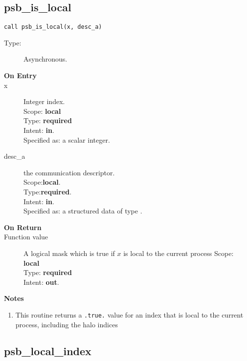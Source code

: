 \clearpage\subsection*{psb\_is\_local }

\begin{verbatim}
call psb_is_local(x, desc_a)
\end{verbatim}

\begin{description}
\item[Type:] Asynchronous.
\item[\bf On Entry]
\item[x] Integer index.\\
Scope: {\bf local} \\
Type: {\bf required}\\
Intent: {\bf in}.\\
Specified as: a scalar integer.\\
\item[desc\_a] the communication descriptor.\\
Scope:{\bf local}.\\
Type:{\bf required}.\\
Intent: {\bf in}.\\
Specified as: a structured data of type \descdata.
\end{description}

\begin{description}
\item[\bf On Return]
\item[Function value] A logical mask which is true if 
  $x$ is  local to the current process
Scope: {\bf local} \\
Type: {\bf required}\\
Intent: {\bf out}.\\
\end{description}


{\par\noindent\large\bfseries Notes}
\begin{enumerate}
\item This routine returns a \verb|.true.| value for an index
  that is local to the current process, including the halo
  indices
\end{enumerate}

\clearpage\subsection*{psb\_local\_index }

